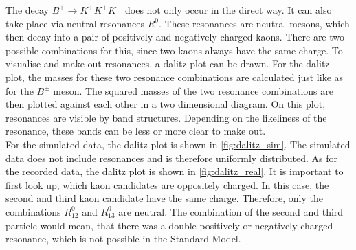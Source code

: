 The decay $B^{\pm} \rightarrow K^{\pm} K^+ K^-$ does not only occur in the direct way. It can also take place via neutral resonances $R^0$. These resonances are neutral mesons, which then decay into a pair of positively and negatively
charged kaons. There are two possible combinations for this, since two kaons always have the same charge. To visualise and make out resonances, a dalitz plot can be drawn. For the dalitz plot, the masses for these two resonance combinations
are calculated just like as for the $B^{\pm}$ meson. The squared masses of the two resonance combinations are then plotted against each other in a two dimensional diagram. On this plot, resonances are visible by band structures. Depending
on the likeliness of the resonance, these bands can be less or more clear to make out.\\
For the simulated data, the dalitz plot is shown in \autoref{fig:dalitz_sim}. The simulated data does not include resonances and is therefore uniformly distributed.
As for the recorded data, the dalitz plot is shown in \autoref{fig:dalitz_real}. It is important to first look up, which kaon candidates are oppositely charged. In this case, the second and third kaon candidate have the same charge. 
Therefore, only the combinations $R_{12}^0$ and $R_{13}^0$ are neutral. The combination of the second and third particle would mean, that there was a double positively or negatively charged resonance, which is not possible in the Standard Model.
